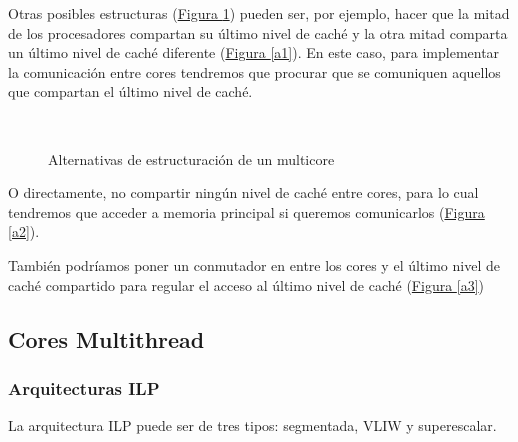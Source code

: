 \documentclass[10pt,a4paper,spanish]{report}
\begin{document}
Otras posibles estructuras (\hyperref[as]{Figura \ref*{as}}) pueden ser, por ejemplo, hacer que la mitad de los procesadores compartan su último nivel de caché y la otra mitad comparta un último nivel de caché diferente (\hyperref[a1]{Figura \ref*{a1}}). En este caso, para implementar la comunicación entre cores tendremos que procurar que se comuniquen aquellos que compartan el último nivel de caché.

\begin{figure}[!h]
\centering
\mbox {
\qquad
{}
}
\caption{Alternativas de estructuración de un multicore}
\label{as}
\end{figure}

O directamente, no compartir ningún nivel de caché entre cores, para lo cual tendremos que acceder a memoria principal si queremos comunicarlos (\hyperref[a2]{Figura \ref*{a2}}).

También podríamos poner un conmutador en entre los cores y el último nivel de caché compartido para regular el acceso al último nivel de caché (\hyperref[a3]{Figura \ref*{a3}})

\textcolor[rgb]{0.2,0.4,0.8}{\subsection{Cores Multithread}}
\textcolor[rgb]{0.2,0.4,0.8}{\subsubsection{Arquitecturas ILP}}
La arquitectura ILP puede ser de tres tipos: segmentada, VLIW y superescalar. 
\end{document}

